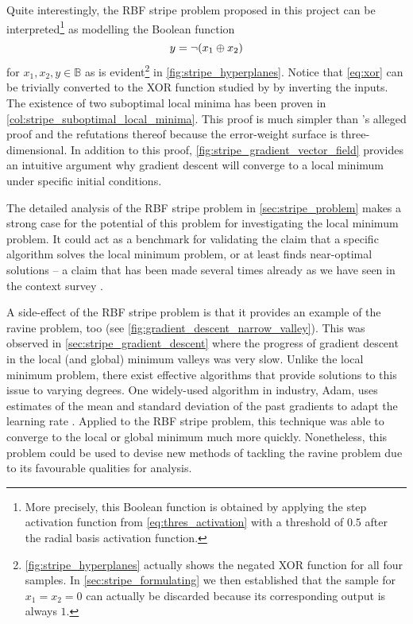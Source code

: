 Quite interestingly, the RBF stripe problem proposed in this project can be interpreted\footnote{More precisely, this Boolean function is obtained by applying the step activation function from \ref{eq:thres_activation} with a threshold of $0.5$ after the radial basis activation function.} as modelling the Boolean function
\begin{equation}
    \label{eq:xor}
    y=\neg (x_1 \oplus x_2)
\end{equation}
for $x_1,x_2,y\in \mathbb{B}$ as is evident\footnote{\ref{fig:stripe_hyperplanes} actually shows the negated XOR function for all four samples. In \ref{sec:stripe_formulating} we then established that the sample for $x_1=x_2=0$ can actually be discarded because its corresponding output is always $1$.} in \ref{fig:stripe_hyperplanes}.
Notice that \ref{eq:xor} can be trivially converted to the XOR function studied by \citeauthor{blum1989} by inverting the inputs.
The existence of two suboptimal local minima has been proven in \ref{col:stripe_suboptimal_local_minima}.
This proof is much simpler than \citeauthor{blum1989}'s alleged proof and the refutations thereof because the error-weight surface is three-dimensional.
In addition to this proof, \ref{fig:stripe_gradient_vector_field} provides an intuitive argument why gradient descent will converge to a local minimum under specific initial conditions.

The detailed analysis of the RBF stripe problem in \ref{sec:stripe_problem} makes a strong case for the potential of this problem for investigating the local minimum problem.
It could act as a benchmark for validating the claim that a specific algorithm solves the local minimum problem, or at least finds near-optimal solutions -- a claim that has been made several times already as we have seen in the context survey \cite{kawaguchi2016,choi2008,hirasawa1998,lo2012,lo2017}.

A side-effect of the RBF stripe problem is that it provides an example of the ravine problem, too (see \ref{fig:gradient_descent_narrow_valley}).
This was observed in \ref{sec:stripe_gradient_descent} where the progress of gradient descent in the local (and global) minimum valleys was very slow.
Unlike the local minimum problem, there exist effective algorithms that provide solutions to this issue to varying degrees.
One widely-used algorithm in industry, Adam, uses estimates of the mean and standard deviation of the past gradients to adapt the learning rate \cite{kingma2014}.
Applied to the RBF stripe problem, this technique was able to converge to the local or global minimum much more quickly.
Nonetheless, this problem could be used to devise new methods of tackling the ravine problem due to its favourable qualities for analysis.

